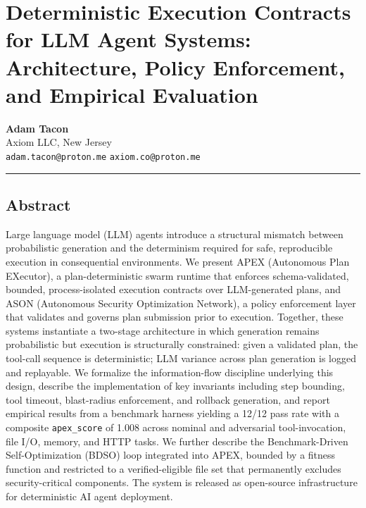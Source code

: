 \documentclass[
]{article}
\author{}
\date{}
\begin{document}
\section{Deterministic Execution Contracts for LLM Agent Systems:
Architecture, Policy Enforcement, and Empirical
Evaluation}\label{deterministic-execution-contracts-for-llm-agent-systems-architecture-policy-enforcement-and-empirical-evaluation}

\textbf{Adam Tacon}\\
Axiom LLC, New Jersey\\
\texttt{adam.tacon@proton.me} \texttt{axiom.co@proton.me}

\begin{center}\rule{0.5\linewidth}{0.5pt}\end{center}

\subsection{Abstract}\label{abstract}

Large language model (LLM) agents introduce a structural mismatch
between probabilistic generation and the determinism required for safe,
reproducible execution in consequential environments. We present APEX
(Autonomous Plan EXecutor), a plan-deterministic swarm runtime that
enforces schema-validated, bounded, process-isolated execution contracts
over LLM-generated plans, and ASON (Autonomous Security Optimization
Network), a policy enforcement layer that validates and governs plan
submission prior to execution. Together, these systems instantiate a
two-stage architecture in which generation remains probabilistic but
execution is structurally constrained: given a validated plan, the
tool-call sequence is deterministic; LLM variance across plan generation
is logged and replayable. We formalize the information-flow discipline
underlying this design, describe the implementation of key invariants
including step bounding, tool timeout, blast-radius enforcement, and
rollback generation, and report empirical results from a benchmark
harness yielding a 12/12 pass rate with a composite \texttt{apex\_score}
of 1.008 across nominal and adversarial tool-invocation, file I/O,
memory, and HTTP tasks. We further describe the Benchmark-Driven
Self-Optimization (BDSO) loop integrated into APEX, bounded by a fitness
function and restricted to a verified-eligible file set that permanently
excludes security-critical components. The system is released as
open-source infrastructure for deterministic AI agent deployment.
\end{document}
